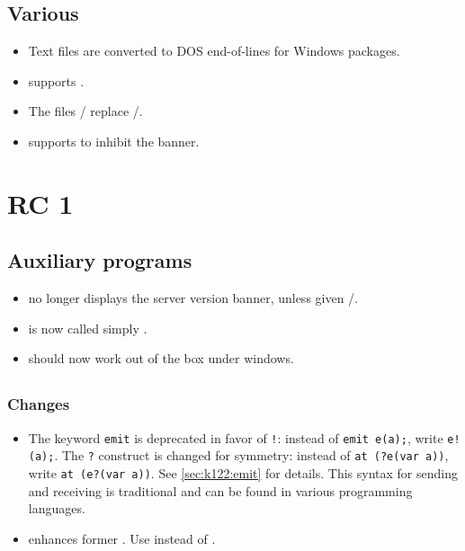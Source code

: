 \subsection{Various}

\begin{itemize}
\item Text files are converted to DOS end-of-lines for Windows packages.

\item {} supports .

\item The files / replace
  /.

\item {} supports  to inhibit the banner.
\end{itemize}

\section{ RC 1}

\subsection{Auxiliary programs}

\begin{itemize}
\item {} no longer displays the server version
  banner, unless given /.
\item {} is now called simply .
\item {} should now work out of the box under windows.
\end{itemize}


\subsection{\us}
\subsubsection{Changes}

\begin{itemize}
\item The keyword \lstinline|emit| is deprecated in favor of \lstinline|!|:
  instead of \lstinline|emit e(a);|, write \lstinline|e!(a);|.  The
  \lstinline|?| construct is changed for symmetry: instead of
  \lstinline|at (?e(var a))|, write \lstinline|at (e?(var a))|.  See
  \autoref{sec:k122:emit} for details.  This syntax for sending and
  receiving is traditional and can be found in various programming
  languages.

\item {} enhances former .
  Use  instead of .
\end{itemize}

